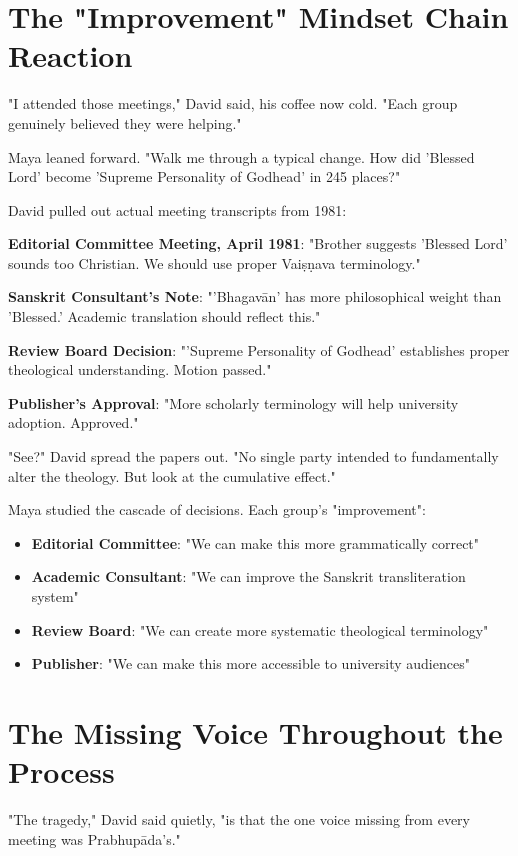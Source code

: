 \documentclass[11pt,twoside]{book}
\begin{document}
\section*{The "Improvement" Mindset Chain Reaction}
\label{sec:orgfc68a01}

"I attended those meetings," David said, his coffee now cold. "Each group genuinely believed they were helping."

Maya leaned forward. "Walk me through a typical change. How did 'Blessed Lord' become 'Supreme Personality of Godhead' in 245 places?"

David pulled out actual meeting transcripts from 1981:

\textbf{\textbf{Editorial Committee Meeting, April 1981}}: "Brother suggests 'Blessed Lord' sounds too Christian. We should use proper Vaiṣṇava terminology."

\textbf{\textbf{Sanskrit Consultant's Note}}: "'Bhagavān' has more philosophical weight than 'Blessed.' Academic translation should reflect this."

\textbf{\textbf{Review Board Decision}}: "'Supreme Personality of Godhead' establishes proper theological understanding. Motion passed."

\textbf{\textbf{Publisher's Approval}}: "More scholarly terminology will help university adoption. Approved."

"See?" David spread the papers out. "No single party intended to fundamentally alter the theology. But look at the cumulative effect."

Maya studied the cascade of decisions. Each group's "improvement":
\begin{itemize}
\item \textbf{\textbf{Editorial Committee}}: "We can make this more grammatically correct"
\item \textbf{\textbf{Academic Consultant}}: "We can improve the Sanskrit transliteration system"
\item \textbf{\textbf{Review Board}}: "We can create more systematic theological terminology"
\item \textbf{\textbf{Publisher}}: "We can make this more accessible to university audiences"
\end{itemize}
\section*{The Missing Voice Throughout the Process}
\label{sec:org241d94d}

"The tragedy," David said quietly, "is that the one voice missing from every meeting was Prabhupāda's."
\end{document}
